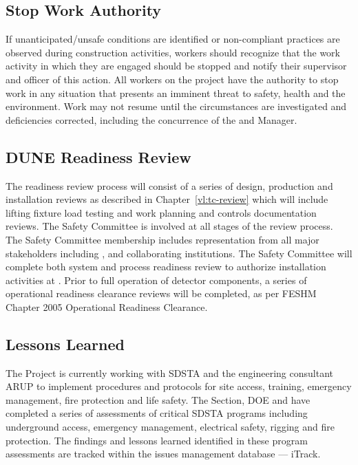 \subsection{Stop Work Authority}

If unanticipated/unsafe conditions are identified or non-compliant
practices are observed during construction activities, workers should
recognize that the work activity in which they are engaged should be
stopped and notify their supervisor and  officer of
this action. All workers on the  project have the
authority to stop work in any situation that presents an imminent
threat to safety, health and the environment. Work may not resume
until the circumstances are investigated and deficiencies corrected,
including the concurrence of the  
and   Manager.

\subsection{DUNE Readiness Review}

The  readiness review process will consist of a series of
design, production and installation reviews as described in
Chapter~\ref{vl:tc-review} which will include lifting fixture load
testing and work planning and controls documentation reviews. The
 Safety Committee is involved at all stages of the review
process.  The  Safety Committee membership includes
representation from all major stakeholders including \fnal,  and
 collaborating institutions. The  Safety
Committee will complete both system and process readiness review to
authorize installation activities at .  Prior to full operation
of detector components, a series of operational readiness clearance
reviews will be completed, as per FESHM Chapter 2005 Operational
Readiness Clearance.

\subsection{Lessons Learned}

The  Project is currently working with SDSTA and the 
engineering consultant ARUP to implement  procedures and
protocols for site access, training, emergency management, fire
protection and life safety. The \fnal {} Section, DOE and
  have completed a series of assessments of
critical SDSTA  programs including underground access,
emergency management, electrical safety, rigging and fire
protection. The findings and lessons learned identified in these
 program assessments are tracked within the \fnal issues management
database --- iTrack.

